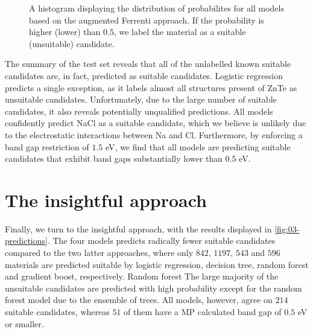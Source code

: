 \begin{figure}[ht!]
    \centering
    
    \vspace*{-130mm}
    \caption{A histogram displaying the distribution of probabilites for all models based on the augmented Ferrenti approach. If the probability is higher (lower) than $0.5$, we label the material as a suitable (unsuitable) candidate.}
    \label{fig:histogram-augmented-ferrenti}
\end{figure}

The summary of the test set reveals that all of the unlabelled known suitable candidates are, in fact, predicted as suitable candidates. Logistic regression predicts a single exception, as it labels almost all structures present of ZnTe as unsuitable candidates. Unfortunately, due to the large number of suitable candidates, it also reveals potentially unqualified predictions. All models confidently predict NaCl as a suitable candidate, which we believe is unlikely due to the electrostatic interactions between Na and Cl. Furthermore, by enforcing a band gap restriction of $1.5$ eV, we find that all models are predicting suitable candidates that exhibit band gaps substantially lower than $0.5$ eV.



\section{The insightful approach}

Finally, we turn to the insightful approach, with the results displayed in \autoref{fig:03-predictions}. The four models predicts radically fewer suitable candidates compared to the two latter approaches, where only $842$, $1197$, $543$ and $596$ materials are predicted suitable by logistic regression, decision tree, random forest and gradient boost, respectively. Random forest  The large majority of the unsuitable candidates are predicted with high probability except for the random forest model due to the ensemble of trees. All models, however, agree on $214$ suitable candidates, whereas $51$ of them have a MP calculated band gap of $0.5$ eV or smaller.

